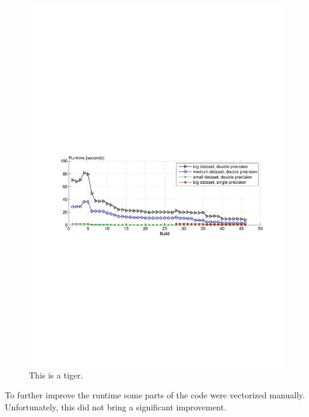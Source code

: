 \begin{figure}\centering
  \includegraphics[scale = 1, trim={6cm 11cm 5cm 14cm}]{graphics/runtime_plot.pdf}
  \caption{This is a tiger.}
\end{figure}

To further improve the runtime some parts of the code were vectorized manually. Unfortunately, this did not bring a significant improvement.

